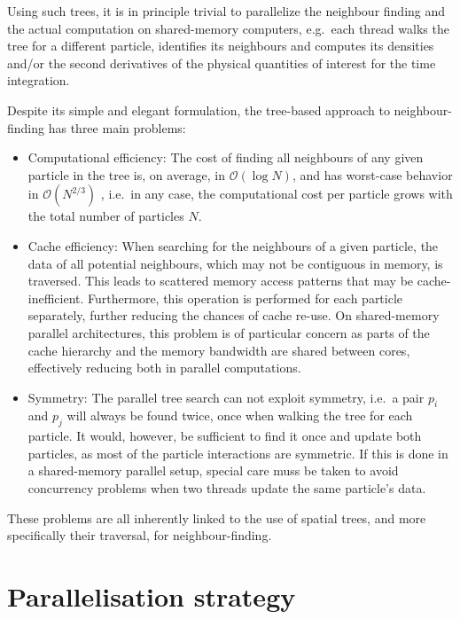 \documentclass{sig-alternate-05-2015}
\newcommand{\oh}[1]{\mbox{$ {\mathcal O}( #1 ) $}}
\begin{document}
Using such trees, it is in principle trivial to parallelize
the neighbour finding and the actual computation on shared-memory
computers,
e.g.~each thread walks the tree for a different particle,
identifies its neighbours and computes its densities and/or
the second derivatives of the physical quantities of interest for 
the time integration.

Despite its simple and elegant formulation, the tree-based
approach to neighbour-finding has three main problems:
\begin{itemize}
    \item Computational efficiency: The cost of finding all neighbours
        of any given particle in the tree is, on average, in \oh{\log N},
        and has worst-case behavior in \oh{N^{2/3}} \cite{Lee1977},
        i.e.~in any case, the computational cost per particle grows with the
        total number of particles $N$.
    \item Cache efficiency: When searching for the neighbours of a
        given particle, the data of all potential neighbours, which may
        not be contiguous in memory, is traversed.
        This leads to scattered memory access patterns that may be
        cache-inefficient. Furthermore, this operation is performed for
        each particle separately, further reducing the chances
        of cache re-use.
        On shared-memory parallel architectures, this problem is of
        particular concern as parts of the cache hierarchy and the
        memory bandwidth are shared between cores, effectively
        reducing both in parallel computations.
    \item Symmetry: The parallel tree search can not exploit symmetry,
        i.e.~a pair $p_i$ and $p_j$ will always be found twice,
        once when walking the tree for each particle. It would, however,
        be sufficient to find it once and update both particles, as most
        of the particle interactions are symmetric.
        If this is done in a shared-memory parallel setup, special
        care muss be taken to avoid concurrency problems when
        two threads update the same particle's data.
\end{itemize}
    
These problems are all inherently linked to the use of
spatial trees, and more specifically their traversal,
for neighbour-finding.



\section{Parallelisation strategy}
\end{document}
